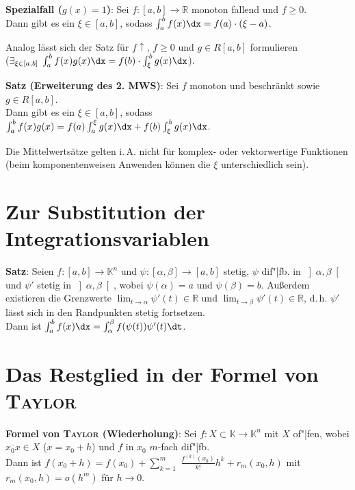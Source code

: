 \textbf{Spezialfall ($g(x) = 1$)}:
Sei $f: [a,b] \rightarrow \mathbb{R}$ monoton fallend und $f \ge 0$. \\
Dann gibt es ein $\xi \in [a,b]$, sodass
$\int_a^b f(x)\dx = f(a) \cdot (\xi - a)$.

Analog lässt sich der Satz für $f\!\!\uparrow$, $f \ge 0$ und $g \in R[a,b]$
formulieren \\
($\exists_{\xi \in [a,b]}\; \int_a^b f(x)g(x)\dx =
f(b) \cdot \int_\xi^b g(x)\dx$).

\linie

\textbf{Satz (Erweiterung des 2. MWS)}:
Sei $f$ monoton und beschränkt sowie $g \in R[a,b]$. \\
Dann gibt es ein $\xi \in [a,b]$, sodass
$\int_a^b f(x)g(x) = f(a) \int_a^\xi g(x)\dx + f(b) \int_\xi^b g(x)\dx$.

Die Mittelwertsätze gelten i.\,A. nicht für komplex- oder vektorwertige
Funktionen (beim komponentenweisen Anwenden können die $\xi$ unterschiedlich
sein).

\section{%
    Zur Substitution der Integrationsvariablen%
}

\textbf{Satz}:
Seien $f: [a,b] \rightarrow \mathbb{K}^n$ und
$\psi: [\alpha,\beta] \rightarrow [a,b]$ stetig, $\psi$ dif"|fb. in
$\left]\alpha,\beta\right[$ und $\psi'$ stetig in $\left]\alpha,\beta\right[$,
wobei $\psi(\alpha) = a$ und $\psi(\beta) = b$.
Außerdem existieren die Grenzwerte
$\lim_{t \to \alpha} \psi'(t) \in \mathbb{R}$ und
$\lim_{t \to \beta} \psi'(t) \in \mathbb{R}$,
d.\,h. $\psi'$ lässt sich in den Randpunkten stetig fortsetzen. \\
Dann ist $\int_a^b f(x)\dx = \int_\alpha^\beta f(\psi(t)) \psi'(t)\dt$.

\section{%
    Das Restglied in der Formel von \textsc{Taylor}%
}

\textbf{Formel von \textsc{Taylor} (Wiederholung)}:
Sei $f: X \subset \mathbb{K} \rightarrow \mathbb{K}^n$ mit $X$ of"|fen,
wobei $\overline{x_0 x} \in X$ ($x = x_0 + h$) und $f$ in $x_0$ $m$-fach
dif"|fb. \\
Dann ist $f(x_0 + h) = f(x_0) + \sum_{k=1}^m$
{\large $\frac{f^{(k)}(x_0)}{k!}$}$h^k +
r_m(x_0, h)$ mit $r_m(x_0, h) = o(h^m)$ für $h \to 0$.

